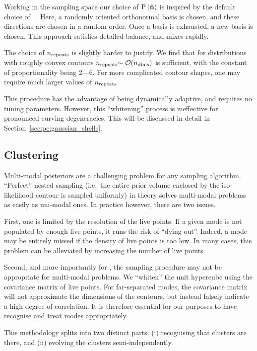Working in the sampling space our choice of $\mathrm{P}\left(\mathbf{\hat{n}}\right)$ is inspired by the default choice of \CosmoMC{}~\citep{LewisFastSlow}. Here, a randomly oriented orthonormal basis is chosen, and these directions are chosen in a random order. Once a basis is exhausted, a new basis is chosen. This approach satisfies detailed balance, and mixes rapidly.

The choice of $n_{\mathrm{repeats}}$ is slightly harder to justify. We find that for distributions with roughly convex contours $n_{\mathrm{repeats}}{\sim\mathcal{O}{\left(n_{\mathrm{dims}}\right)}}$ is sufficient, with the constant of proportionality being $2$---$6$. For more complicated contour shapes, one may require much larger values of $n_{\mathrm{repeats}}$. 

This procedure has the advantage of being dynamically adaptive, and requires no tuning parameters. However, this ``whitening'' process is ineffective for pronounced curving degeneracies. This will be discussed in detail in Section~\ref{sec:pc:gaussian_shells}.


\subsection{Clustering}
\label{sec:pc:clustering}
Multi-modal posteriors are a challenging problem for any sampling algorithm. ``Perfect'' nested sampling (i.e.\ the entire prior volume enclosed by the iso-likelihood contour is sampled uniformly) in theory solves multi-modal problems as easily as uni-modal ones. In practice however, there are two issues.

First, one is limited by the resolution of the live points. If a given mode is not populated by enough live points, it runs the risk of ``dying out''. Indeed, a mode may be entirely missed if the density of live points is too low. In many cases, this problem can be alleviated by increasing the number of live points.

Second, and more importantly for \PolyChord{}, the sampling procedure may not be appropriate for multi-modal problems. We ``whiten'' the unit hypercube using the covariance matrix of live points. For far-separated modes, the covariance matrix will not approximate the dimensions of the contours, but instead falsely indicate a high degree of correlation.  It is therefore essential for our purposes to have \PolyChord{} recognise and treat modes appropriately.


This methodology splits into two distinct parts:
  (i) recognising that clusters are there, and
  (ii) evolving the clusters semi-independently.

